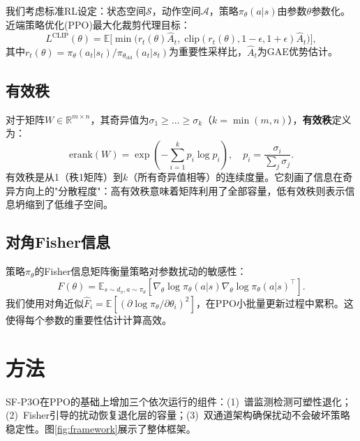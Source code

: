 \documentclass[twocolumn]{article}
\newcommand{\erank}{\mathrm{erank}}
\newcommand{\E}{\mathbb{E}}
\newcommand{\R}{\mathbb{R}}
\begin{document}
我们考虑标准RL设定：状态空间$\mathcal{S}$，动作空间$\mathcal{A}$，策略$\pi_\theta(a|s)$由参数$\theta$参数化。近端策略优化(PPO)\cite{schulman2017ppo}最大化裁剪代理目标：
\begin{equation}
    L^{\text{CLIP}}(\theta) = \E\Big[\min\big(r_t(\theta)\hat{A}_t,\; \text{clip}(r_t(\theta), 1{-}\epsilon, 1{+}\epsilon)\hat{A}_t\big)\Big],
\end{equation}
其中$r_t(\theta) = \pi_\theta(a_t|s_t)/\pi_{\theta_{\text{old}}}(a_t|s_t)$为重要性采样比，$\hat{A}_t$为GAE优势估计。

\subsection{有效秩}

对于矩阵$W \in \R^{m \times n}$，其奇异值为$\sigma_1 \geq \ldots \geq \sigma_k$（$k = \min(m,n)$），\textbf{有效秩}\cite{roy2007effective}定义为：
\begin{equation}
    \erank(W) = \exp\!\left(-\sum_{i=1}^{k} p_i \log p_i\right), \quad p_i = \frac{\sigma_i}{\sum_j \sigma_j}.
    \label{eq:erank}
\end{equation}
有效秩是从1（秩1矩阵）到$k$（所有奇异值相等）的连续度量。它刻画了信息在奇异方向上的"分散程度"：高有效秩意味着矩阵利用了全部容量，低有效秩则表示信息坍缩到了低维子空间。

\subsection{对角Fisher信息}

策略$\pi_\theta$的Fisher信息矩阵衡量策略对参数扰动的敏感性：
\begin{equation}
    F(\theta) = \E_{s \sim d_\pi, a \sim \pi_\theta}\!\left[\nabla_\theta \log \pi_\theta(a|s) \nabla_\theta \log \pi_\theta(a|s)^\top\right].
\end{equation}
我们使用对角近似$\hat{F}_i = \E[(\partial \log \pi_\theta / \partial \theta_i)^2]$，在PPO小批量更新过程中累积。这使得每个参数的重要性估计计算高效。


\section{方法}
\label{sec:method}

SF-P3O在PPO的基础上增加三个依次运行的组件：(1)~谱监测检测可塑性退化；(2)~Fisher引导的扰动恢复退化层的容量；(3)~双通道架构确保扰动不会破坏策略稳定性。图\ref{fig:framework}展示了整体框架。
\end{document}
